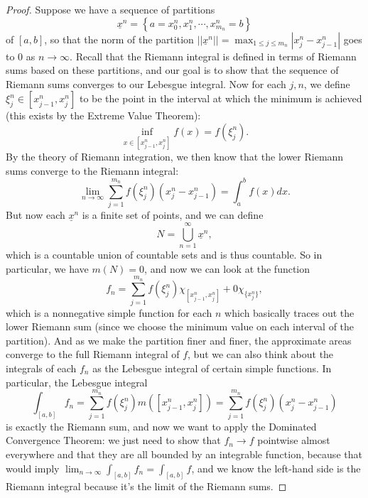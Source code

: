 \begin{proof}
Suppose we have a sequence of partitions
\[
    \underline{x}^n = \left\{a = x_0^n, x_1^n, \cdots, x_{m_n}^n = b\right\}
\]  
of $[a, b]$, so that the norm of the partition $||\underline{x}^n|| = \max_{1 \le j \le m_n} |x_j^n - x_{j-1}^n|$ goes to $0$ as $n \to \infty$. Recall that the Riemann integral is defined in terms of Riemann sums based on these partitions, and our goal is to show that the sequence of Riemann sums converges to our Lebesgue integral. Now for each $j, n$, we define $\xi^n_j \in [x_{j-1}^n, x_j^n]$ to be the point in the interval at which the minimum is achieved (this exists by the Extreme Value Theorem):
\[
    \inf_{x \in [x_{j-1}^n, x_j^n]} f(x) = f(\xi_j^n).
\]
By the theory of Riemann integration, we then know that the lower Riemann sums converge to the Riemann integral:
\[
    \lim_{n \to \infty} \sum_{j=1}^{m_n} f(\xi_j^n) (x_j^n - x_{j-1}^n) = \int_a^b f(x) dx.
\]
But now each $\underline{x}^n$ is a finite set of points, and we can define 
\[
    N = \bigcup_{n=1}^{\infty} \underline{x}^n,
\]
which is a countable union of countable sets and is thus countable. So in particular, we have $m(N) = 0$, and now we can look at the function 
\[
    f_n = \sum_{j=1}^{m_n} f(\xi_j^n) \chi_{[x_{j-1}^n, x_j^n]} + 0 \chi_{\{x_j^n\}},
\]
which is a nonnegative simple function for each $n$ which basically traces out the lower Riemann sum (since we choose the minimum value on each interval of the partition). And as we make the partition finer and finer, the approximate areas converge to the full Riemann integral of $f$, but we can also think about the integrals of each $f_n$ as the Lebesgue integral of certain simple functions. In particular, the Lebesgue integral
\[
    \int_{[a, b]} f_n = \sum_{j=1}^{m_n} f(\xi_j^n) m([x_{j-1}^n, x_j^n]) = \sum_{j=1}^{m_n} f(\xi_j^n) \left(x_j^n - x_{j-1}^n\right)
\] 
is exactly the Riemann sum, and now we want to apply the Dominated Convergence Theorem: we just need to show that $f_n \to f$ pointwise almost everywhere and that they are all bounded by an integrable function, because that would imply $\lim_{n \to \infty} \int_{[a, b]} f_n = \int_{[a, b]} f$, and we know the left-hand side is the Riemann integral because it's the limit of the Riemann sums. 


\end{proof}
